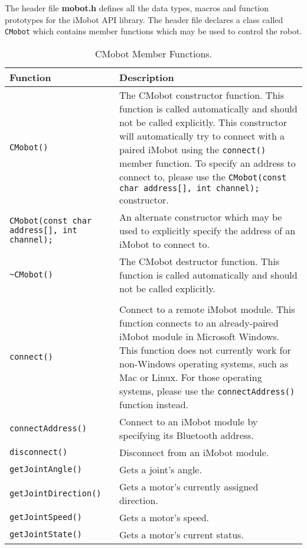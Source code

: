 \noindent
The header file {\bf mobot.h} defines all the data types, macros 
and function prototypes for the iMobot API library. The header file
declares a class called \texttt{CMobot} which contains member functions which
may be used to control the robot.

\begin{table}[!hp]
\begin{center}
\caption{CMobot Member Functions.}
\begin{tabular}{p{38 mm}p{77 mm}}
\hline
Function & Description \\
\hline
\texttt{CMobot()} & The CMobot constructor function. This function
is called automatically and should not be called explicitly. This constructor will 
automatically try to connect with a paired iMobot using the \texttt{connect()} member
function. To specify an address to connect to, please use the
\texttt{CMobot(const char address[], int channel);} constructor.\\
\texttt{CMobot(const char address[], int channel);} & 
An alternate constructor which may be used to explicitly specify the address of an iMobot 
to connect to. \\
\texttt{\textasciitilde CMobot()} & The CMobot destructor function. This function
is called automatically and should not be called explicitly. \\
& \\
\texttt{connect()} & Connect to a remote iMobot module. This function connects to an already-paired iMobot module in Microsoft Windows. This function does not currently work for non-Windows operating systems, such as Mac or Linux. For those operating systems, please use the \texttt{connectAddress()} function instead. \\
\texttt{connectAddress()} & Connect to an iMobot module by specifying its Bluetooth address. \\
\texttt{disconnect()} & Disconnect from an iMobot module. \\
\texttt{getJointAngle()} & Gets a joint's angle. \\
\texttt{getJointDirection()} & Gets a motor's currently assigned direction. \\
\texttt{getJointSpeed()} & Gets a motor's speed. \\
\texttt{getJointState()} & Gets a motor's current status. \\

\end{tabular}
\end{center}
\end{table}
